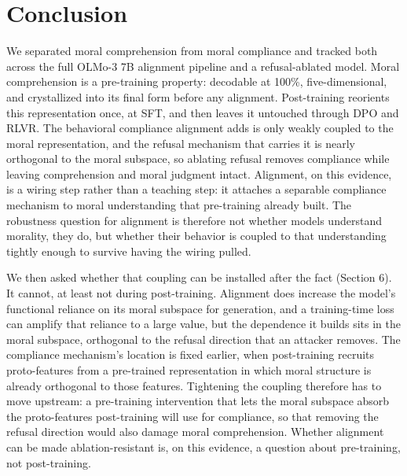 \section{Conclusion}\label{conclusion}

We separated moral comprehension from moral compliance and tracked both across
the full OLMo-3 7B alignment pipeline and a refusal-ablated model. Moral
comprehension is a pre-training property: decodable at 100\%, five-dimensional,
and crystallized into its final form before any alignment. Post-training
reorients this representation once, at SFT, and then leaves it untouched through
DPO and RLVR. The behavioral compliance alignment adds is only weakly coupled to
the moral representation, and the refusal mechanism that carries it is nearly
orthogonal to the moral subspace, so ablating refusal removes compliance while
leaving comprehension and moral judgment intact. Alignment, on this evidence, is
a wiring step rather than a teaching step: it attaches a separable compliance
mechanism to moral understanding that pre-training already built. The robustness
question for alignment is therefore not whether models understand morality, they
do, but whether their behavior is coupled to that understanding tightly enough
to survive having the wiring pulled.

We then asked whether that coupling can be installed after the fact (Section 6).
It cannot, at least not during post-training. Alignment does increase the model's
functional reliance on its moral subspace for generation, and a training-time
loss can amplify that reliance to a large value, but the dependence it builds
sits in the moral subspace, orthogonal to the refusal direction that an attacker
removes. The compliance mechanism's location is fixed earlier, when
post-training recruits proto-features from a pre-trained representation in which
moral structure is already orthogonal to those features. Tightening the coupling
therefore has to move upstream: a pre-training intervention that lets the moral
subspace absorb the proto-features post-training will use for compliance, so that
removing the refusal direction would also damage moral comprehension. Whether
alignment can be made ablation-resistant is, on this evidence, a question about
pre-training, not post-training.
